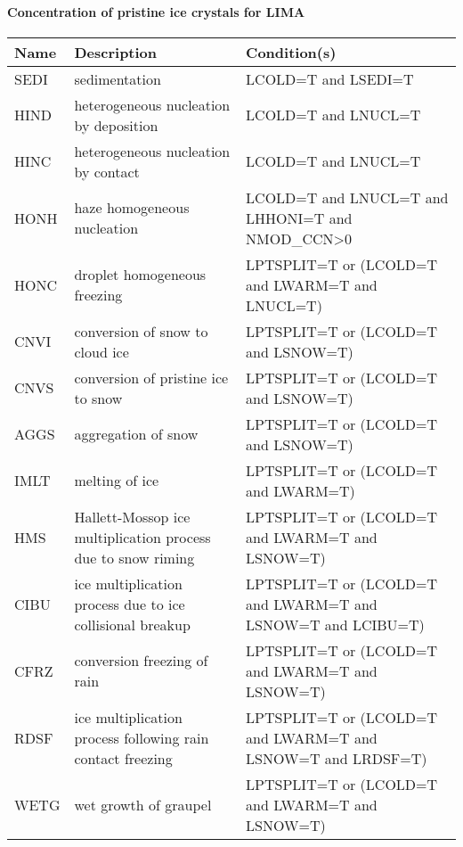 \paragraph{Concentration of pristine ice crystals for LIMA}
\mbox{} %

\begin{longtable} {|p{}|p{}|p{}|}
\hline
Name & Description & Condition(s) \\
\hline \hline
\endhead
SEDI   & sedimentation                                  & LCOLD=T and LSEDI=T \\\hline
HIND   & heterogeneous nucleation by deposition         & LCOLD=T and LNUCL=T \\\hline
HINC   & heterogeneous nucleation by contact            & LCOLD=T and LNUCL=T \\\hline
HONH   & haze homogeneous nucleation                    & LCOLD=T and LNUCL=T and LHHONI=T and NMOD\_CCN>0 \\\hline
HONC   & droplet homogeneous freezing                   & LPTSPLIT=T or (LCOLD=T and LWARM=T and LNUCL=T) \\\hline
CNVI   & conversion of snow to cloud ice                & LPTSPLIT=T or (LCOLD=T and LSNOW=T) \\\hline
CNVS   & conversion of pristine ice to snow             & LPTSPLIT=T or (LCOLD=T and LSNOW=T) \\\hline
AGGS   & aggregation of snow                            & LPTSPLIT=T or (LCOLD=T and LSNOW=T) \\\hline
IMLT   & melting of ice                                 & LPTSPLIT=T or (LCOLD=T and LWARM=T) \\\hline
HMS    & Hallett-Mossop ice multiplication process due to snow riming    & LPTSPLIT=T or (LCOLD=T and LWARM=T and LSNOW=T) \\\hline
CIBU   & ice multiplication process due to ice collisional breakup & LPTSPLIT=T or (LCOLD=T and LWARM=T and LSNOW=T and LCIBU=T) \\\hline
CFRZ   & conversion freezing of rain                    & LPTSPLIT=T or (LCOLD=T and LWARM=T and LSNOW=T) \\\hline
RDSF   & ice multiplication process following rain contact freezing & LPTSPLIT=T or (LCOLD=T and LWARM=T and LSNOW=T and LRDSF=T) \\\hline
WETG   & wet growth of graupel                          & LPTSPLIT=T or (LCOLD=T and LWARM=T and LSNOW=T) \\\hline

\end{longtable}
